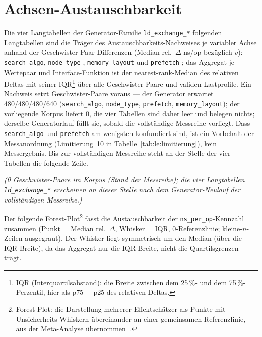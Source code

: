 \section{Achsen-Austauschbarkeit}\label{sec:measurements:exchange}

Die vier \ifPlatzhalterAlsTabelle{}Langtabellen der Generator-Familie \texttt{ld\_exchange\_*}\else
folgenden Langtabellen\fi{} sind die Träger des Austauschbarkeits-Nachweises je variabler Achse
anhand der Geschwister-Paar-Differenzen (Median rel.\ $\Delta$ ns/op bezüglich $v$):
\texttt{search\_algo}, \texttt{node\_type}%
, \texttt{memory\_layout}%
 und \texttt{prefetch}%
; das Aggregat je Wertepaar und Interface-Funktion ist der
nearest-rank-Median des relativen Deltas mit seiner IQR\footnote{IQR (Interquartilsabstand): die
Breite zwischen dem 25\,\%- und dem 75\,\%-Perzentil, hier als p75 $-$ p25 des relativen Deltas.}
über alle Geschwister-Paare und validen Lastprofile. Ein Nachweis setzt Geschwister-Paare voraus
--- der Generator erwartet 480/480/480/640 (\texttt{search\_algo}, \texttt{node\_type},
\texttt{prefetch}, \texttt{memory\_layout}); der vorliegende Korpus liefert 0, die vier Tabellen sind
daher leer und belegen nichts; derselbe Generatorlauf füllt sie, sobald die vollständige Messreihe vorliegt. Dass
\texttt{search\_algo} und \texttt{prefetch} am wenigsten konfundiert sind, ist ein Vorbehalt der
Messanordnung (Limitierung~10 in Tabelle~\ref{tab:le:limitierung}), kein Messergebnis.\ifPlatzhalterAlsTabelle{}
Bis zur vollständigen Messreihe steht an der Stelle der vier Tabellen die folgende Zeile.\fi

\ifPlatzhalterAlsTabelle%
\emph{(0 Geschwister-Paare im Korpus (Stand der Messreihe); die vier Langtabellen
\texttt{ld\_exchange\_*} erscheinen an dieser Stelle nach dem Generator-Neulauf der vollständigen
Messreihe.)}
\else




\fi

Der folgende Forest-Plot\footnote{Forest-Plot: die Darstellung mehrerer Effektschätzer als Punkte
mit Unsicherheits-Whiskern übereinander an einer gemeinsamen Referenzlinie, aus der Meta-Analyse
übernommen~\cite{lewis2001forest}.} fasst die Austauschbarkeit der \texttt{ns\_per\_op}-Kennzahl
zusammen (Punkt = Median rel.\ $\Delta$, Whisker = IQR, 0-Referenzlinie; kleine-$n$-Zeilen
ausgegraut). Der Whisker liegt symmetrisch um den Median (über die IQR-Breite), da das Aggregat nur
die IQR-Breite, nicht die Quartilsgrenzen trägt.

